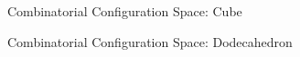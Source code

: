 \documentclass{beamer}
\begin{document}
\begin{frame}{Combinatorial Configuration Space: Cube}
\end{frame}
\begin{frame}{Combinatorial Configuration Space: Dodecahedron}
\end{frame}
\end{document}
